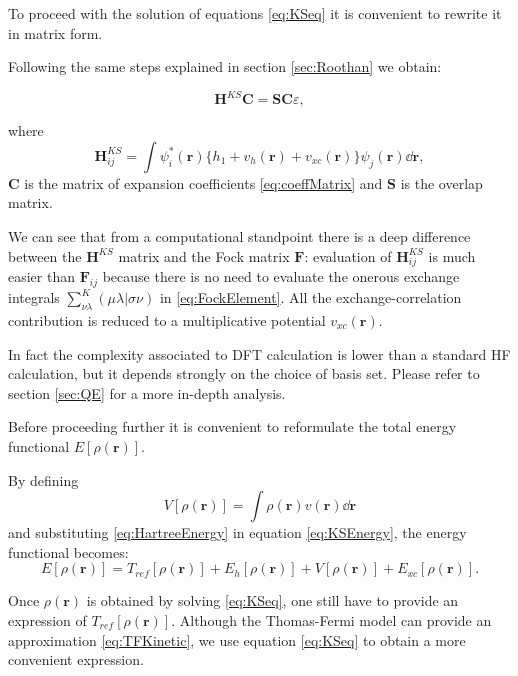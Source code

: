 \documentclass[a4paper,12pt]{article}
\newcommand\dens{\rho(\mathbf{r})}
\newcommand\erre{\mathbf{r}}
\begin{document}
To proceed with the solution of equations \eqref{eq:KSeq} it is convenient to rewrite it in matrix form. 

Following the same steps explained in section \ref{sec:Roothan} we obtain:

\begin{equation}\label{eq:DFTMatrix}
	\mathbf{H}^{KS} \mathbf{C} = \mathbf{S C} \varepsilon,
\end{equation}

where 
\begin{equation}\label{eq:DFTH}
	\mathbf{H}^{KS}_{ij} = \int \psi^{*}_{i}(\erre) \lbrace h_{1} + v_{h}(\erre)+ v_{xc}(\erre) \rbrace \psi_{j}(\erre) \dd{\erre},
\end{equation}
$\mathbf{C}$ is the matrix of expansion coefficients \eqref{eq:coeffMatrix} and $\mathbf{S}$ is the overlap matrix.

We can see that from a computational standpoint there is a deep difference between the $\mathbf{H}^{KS}$ matrix and the Fock matrix $\mathbf{F}$: evaluation of $\mathbf{H}^{KS}_{ij}$ is much easier than $\mathbf{F}_{ij}$ because there is no need to evaluate the onerous exchange integrals $\sum_{\nu \lambda}^{K}(\mu \lambda | \sigma \nu)$ in \eqref{eq:FockElement}. 
All the exchange-correlation contribution is reduced to a multiplicative potential $v_{xc}(\erre)$.

In fact the complexity associated to DFT calculation is lower than a standard HF calculation, but it depends strongly on the choice of basis set. Please refer to section \ref{sec:QE} for a more in-depth analysis.

Before proceeding further it is convenient to reformulate the total energy functional $E[\dens]$.

By defining 
\begin{equation}
	V[\dens] = \int \dens v(\erre) \dd{\erre}
\end{equation}
and substituting \eqref{eq:HartreeEnergy} in equation \eqref{eq:KSEnergy}, the energy functional becomes:
\begin{equation}\label{eq:EnergyFuntional}
	E[\dens] = T_{ref}[\dens] + E_{h}[\dens] + V[\dens] + E_{xc}[\dens].
\end{equation}

Once $\dens$ is obtained by solving \eqref{eq:KSeq}, one still have to provide an expression of $T_{ref}[\dens]$. 
Although the Thomas-Fermi model can provide an approximation \eqref{eq:TFKinetic}, we use equation \eqref{eq:KSeq} to obtain a more convenient expression.
\end{document}
